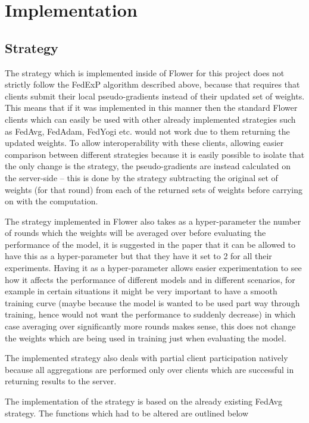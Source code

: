 \documentclass{article}
\begin{document}
\section{Implementation}

\subsection{Strategy}

The strategy which is implemented inside of Flower for this project does not strictly follow the FedExP algorithm described above, because that requires that clients submit their local pseudo-gradients instead of their updated set of weights.  This means that if it was implemented in this manner then the standard Flower clients which can easily be used with other already implemented strategies such as FedAvg, FedAdam, FedYogi etc. would not work due to them returning the updated weights.  To allow interoperability with these clients, allowing easier comparison between different strategies because it is easily possible to isolate that the only change is the strategy, the pseudo-gradients are instead calculated on the server-side -- this is done by the strategy subtracting the original set of weights (for that round) from each of the returned sets of weights before carrying on with the computation.

The strategy implemented in Flower also takes as a hyper-parameter the number of rounds which the weights will be averaged over before evaluating the performance of the model, it is suggested in the paper that it can be allowed to have this as a hyper-parameter but that they have it set to 2 for all their experiments.  Having it as a hyper-parameter allows easier experimentation to see how it affects the performance of different models and in different scenarios, for example in certain situations it might be very important to have a smooth training curve (maybe because the model is wanted to be used part way through training, hence would not want the performance to suddenly decrease) in which case averaging over significantly more rounds makes sense, this does not change the weights which are being used in training just when evaluating the model.

The implemented strategy also deals with partial client participation natively because all aggregations are performed only over clients which are successful in returning results to the server.  

The implementation of the strategy is based on the already existing FedAvg strategy.  The functions which had to be altered are outlined below
\end{document}
